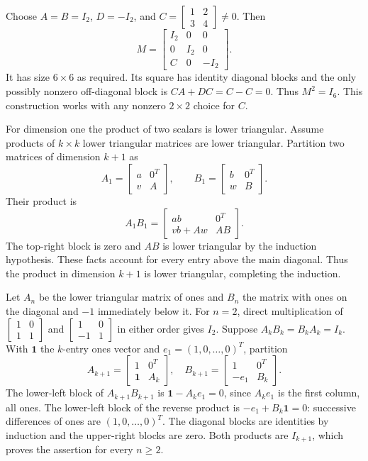 Choose $A=B=I_2$, $D=-I_2$, and
$C=\begin{bmatrix}1&2\\3&4\end{bmatrix}\ne0$. Then
\[M=\begin{bmatrix}I_2&0&0\\0&I_2&0\\C&0&-I_2\end{bmatrix}.
\]
It has size $6\times6$ as required. Its square has identity diagonal
blocks and the only possibly nonzero off-diagonal block is
$CA+DC=C-C=0$. Thus $M^2=I_6$. This construction works with
any nonzero $2\times2$ choice for $C$.

For dimension one the product of two scalars is lower triangular.
Assume products of $k\times k$ lower triangular matrices are lower
triangular. Partition two matrices of dimension $k+1$ as
\[A_1=\begin{bmatrix}a&0^T\\v&A\end{bmatrix},\qquad
B_1=\begin{bmatrix}b&0^T\\w&B\end{bmatrix}.\]
Their product is
\[A_1B_1=\begin{bmatrix}ab&0^T\\vb+Aw&AB\end{bmatrix}.\]
The top-right block is zero and $AB$ is lower triangular by the
induction hypothesis. These facts account for every entry above the
main diagonal. Thus the product in dimension $k+1$ is lower
triangular, completing the induction.

Let $A_n$ be the lower triangular matrix of ones and $B_n$ the
matrix with ones on the diagonal and $-1$ immediately below it.
For $n=2$, direct multiplication of
$\begin{bmatrix}1&0\\1&1\end{bmatrix}$ and
$\begin{bmatrix}1&0\\-1&1\end{bmatrix}$ in either order gives $I_2$.
Suppose $A_kB_k=B_kA_k=I_k$. With $\mathbf1$ the $k$-entry
ones vector and $e_1=(1,0,\ldots,0)^T$, partition
\[A_{k+1}=\begin{bmatrix}1&0^T\\\mathbf1&A_k\end{bmatrix},\quad
B_{k+1}=\begin{bmatrix}1&0^T\\-e_1&B_k\end{bmatrix}.\]
The lower-left block of $A_{k+1}B_{k+1}$ is
$\mathbf1-A_ke_1=0$, since $A_ke_1$ is the first column, all ones.
The lower-left block of the reverse product is
$-e_1+B_k\mathbf1=0$: successive differences of ones are
$(1,0,\ldots,0)^T$. The diagonal blocks are identities by induction
and the upper-right blocks are zero. Both products are $I_{k+1}$,
which proves the assertion for every $n\ge2$.


